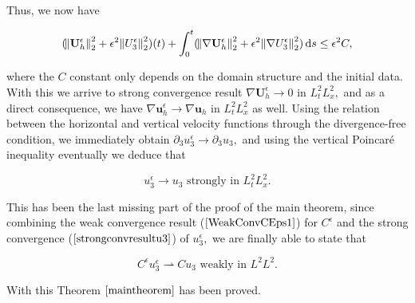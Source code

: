 \documentclass[11pt]{article}
\newcommand*\diff{\mathop{}\!\mathrm{d}}
\begin{document}
Thus, we now have

$$ (\norm{\mathbf{U}_h^\epsilon}_2^2 + \epsilon^2 \norm{U_3^\epsilon}_2^2)(t) + \int_0^t (\norm{\nabla \mathbf{U}_h^\epsilon}_2^2 + \epsilon^2 \norm{\nabla U_3^\epsilon}_2^2) \diff s \leq \epsilon^2 C,$$

where the $C$ constant only depends on the domain structure and the initial data. With this we arrive to strong convergence result $\nabla \mathbf{U}_h^\epsilon \to 0$ in $L^2_t L^2_x,$ and as a direct consequence, we have $\nabla \mathbf{u}_h^\epsilon \to \nabla \mathbf{u}_h$ in $L^2_t L^2_x$ as well. Using the relation between the horizontal and vertical velocity functions through the divergence-free condition, we immediately obtain $\partial_3 u_3^\epsilon \to \partial_3 u_3,$ and using the vertical Poincar\'e inequality eventually we deduce that

\begin{equation}\label{strongconvresultu3}u_3^\epsilon \to u_3 \text{ strongly in } L^2_t L^2_x.\end{equation}

This has been the last missing part of the proof of the main theorem, since combining the weak convergence result ($\ref{WeakConvCEps1}$) for $C^\epsilon$ and the strong convergence ($\ref{strongconvresultu3}$) of $u_3^\epsilon,$ we are finally able to state that

\begin{equation}C^\epsilon u_3^\epsilon \rightharpoonup C u_3 \text{ weakly in } L^2 L^2.\end{equation}

With this Theorem $\ref{maintheorem}$ has been proved.

\nocite{*}


\end{document}

